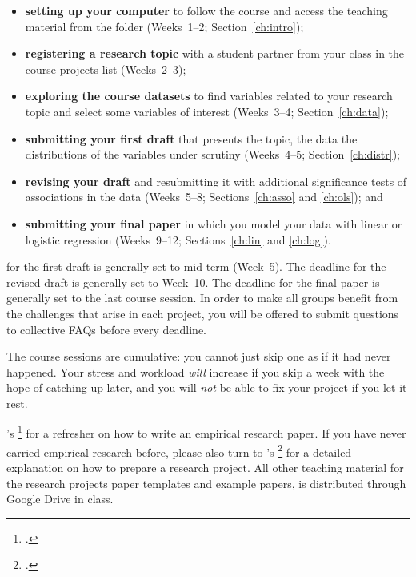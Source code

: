 \begin{enumerate}
    \begin{itemize}
      \item \textbf{setting up your computer} to follow the course and access the teaching material from the \SRQM folder (Weeks~1--2; Section~\ref{ch:intro});%
      \item \textbf{registering a research topic} with a student partner from your class in the course projects list (Weeks~2--3);%
      \item \textbf{exploring the course datasets} to find variables related to your research topic and select some variables of interest (Weeks~3--4; Section~\ref{ch:data});%
      \item \textbf{submitting your first draft} that presents the topic, the data the distributions of the variables under scrutiny (Weeks~4--5; Section~\ref{ch:distr});%
      \item \textbf{revising your draft} and resubmitting it with additional significance tests of associations in the data (Weeks~5--8; Sections~\ref{ch:asso} and \ref{ch:ols}); and%
      \item \textbf{submitting your final paper} in which you model your data with linear or logistic regression (Weeks~9--12; Sections~\ref{ch:lin} and \ref{ch:log}).%
    \end{itemize}

     for the first draft is generally set to mid-term (Week~5). The deadline for the revised draft is generally set to Week~10. The deadline for the final paper is generally set to the last course session. In order to make all groups benefit from the challenges that arise in each project, you will be offered to submit questions to collective FAQs before every deadline.%

     The course sessions are cumulative: you cannot just skip one as if it had never happened. Your stress and workload \emph{will} increase if you skip a week with the hope of catching up later, and you will \emph{not} be able to fix your project if you let it rest.%

		 \citeauthor{White:2005a}'s %
      \footcite{White:2005a} %
      for a refresher on how to write an empirical research paper. If you have never carried empirical research before, please also turn to \citeauthor{BoothWilliams:2003v}'s %
      \footcite{BoothWilliams:2003v} %
      for a detailed explanation on how to prepare a research project. All other teaching material for the research projects paper templates and example papers, is distributed through Google Drive in class.%


\end{enumerate}
